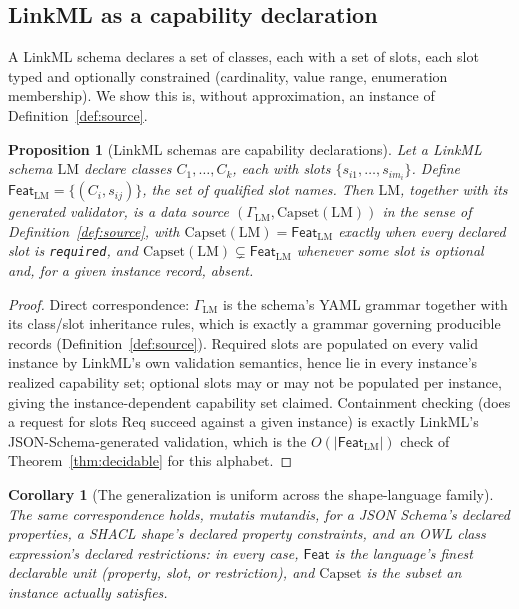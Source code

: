 \documentclass[11pt,a4paper,twocolumn]{article}
\newtheorem{corollary}[theorem]{Corollary}
\newtheorem{proposition}[theorem]{Proposition}
\theoremstyle{definition}
\theoremstyle{remark}
\newcommand{\Feat}{\mathsf{Feat}}
\newcommand{\Capset}{\mathrm{Capset}}
\newcommand{\Req}{\mathrm{Req}}
\newcommand{\LM}{\mathrm{LM}}
\begin{document}
\subsection{LinkML as a capability declaration}

A LinkML schema declares a set of classes, each with a set of slots, each slot
typed and optionally constrained (cardinality, value range, enumeration
membership). We show this is, without approximation, an instance of
Definition~\ref{def:source}.

\begin{proposition}[LinkML schemas are capability declarations]
\label{prop:linkml-capset}
Let a LinkML schema $\LM$ declare classes $C_1,\dots,C_k$, each with slots
$\{s_{i1},\dots,s_{im_i}\}$. Define $\Feat_\LM = \{(C_i,s_{ij})\}$, the set of
qualified slot names. Then $\LM$, together with its generated validator, is a
data source $(\Gamma_\LM,\Capset(\LM))$ in the sense of
Definition~\ref{def:source}, with $\Capset(\LM)=\Feat_\LM$ exactly when every
declared slot is \texttt{required}, and $\Capset(\LM)\subsetneq\Feat_\LM$
whenever some slot is optional and, for a given instance record, absent.
\end{proposition}

\begin{proof}
Direct correspondence: $\Gamma_\LM$ is the schema's YAML grammar together with
its class/slot inheritance rules, which is exactly a grammar governing
producible records (Definition~\ref{def:source}). Required slots are populated
on every valid instance by LinkML's own validation semantics, hence lie in every
instance's realized capability set; optional slots may or may not be populated
per instance, giving the instance-dependent capability set claimed. Containment
checking (does a request for slots $\Req$ succeed against a given instance) is
exactly LinkML's JSON-Schema-generated validation, which is the
$O(|\Feat_\LM|)$ check of Theorem~\ref{thm:decidable} for this alphabet.
\end{proof}

\begin{corollary}[The generalization is uniform across the shape-language family]
\label{cor:family}
The same correspondence holds, mutatis mutandis, for a JSON Schema's declared
properties, a SHACL shape's declared property constraints, and an OWL class
expression's declared restrictions: in every case, $\Feat$ is the language's
finest declarable unit (property, slot, or restriction), and $\Capset$ is the
subset an instance actually satisfies.
\end{corollary}
\end{document}
